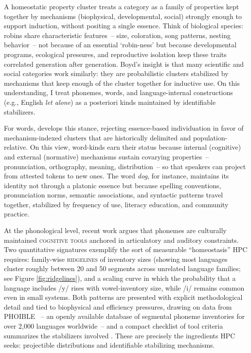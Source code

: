 \documentclass[12pt]{article}
\begin{document}
A homeostatic property cluster treats a category as a family of properties kept together by mechanisms (biophysical, developmental, social) strongly enough to support induction, without positing a single essence. Think of biological species: robins share characteristic features~-- size, coloration, song patterns, nesting behavior~-- not because of an essential `robin-ness' but because developmental programs, ecological pressures, and reproductive isolation keep these traits correlated generation after generation. Boyd's insight is that many scientific and social categories work similarly: they are probabilistic clusters stabilized by mechanisms that keep enough of the cluster together for inductive use. On this understanding, I treat phonemes, words, and language-internal constructions (e.g., English \textit{let alone}) as a posteriori kinds maintained by identifiable stabilizers.

For words, \citet{Miller2021WordsSpeciesKinds} develops this stance, rejecting essence-based individuation in favor of mechanism-indexed clusters that are historically delimited and population-relative. On this view, word-kinds earn their status because internal (cognitive) and external (normative) mechanisms sustain covarying properties~-- pronunciation, orthography, meaning, distribution~-- so that speakers can project from attested tokens to new ones. The word \textit{dog}, for instance, maintains its identity not through a platonic essence but because spelling conventions, pronunciation norms, semantic associations, and syntactic patterns travel together, stabilized by frequency of use, literacy education, and community practice.

At the phonological level, recent work argues that phonemes are culturally maintained \textsc{cognitive tools} anchored in articulatory and auditory constraints. Two quantitative signatures exemplify the sort of measurable ``homeostasis'' HPC requires: family-wise \textsc{ridgelines} of inventory sizes (showing most languages cluster roughly between 20 and 50 segments across unrelated language families; see Figure \ref{fig:ridgelines}), and a scaling curve in which the probability that a language includes /y/ rises with vowel-inventory size, while /i/ remains common even in small systems. Both patterns are presented with explicit methodological detail and tied to biophysical and efficiency pressures, drawing on data from PHOIBLE \citep{MoranEtAl2019PHOIBLE}~-- an openly available database of segmental phoneme inventories for over 2{,}000 languages worldwide~-- and a compact checklist of tool criteria summarizes the stabilizers involved \citep[Fig.\,1 p.\,4; Fig.\,2 p.\,7; Table\,1 p.\,14]{Ekstrom2025PhonemeTool}. These are precisely the ingredients HPC seeks: projectible distributions and identifiable stabilizing mechanisms.
\end{document}

